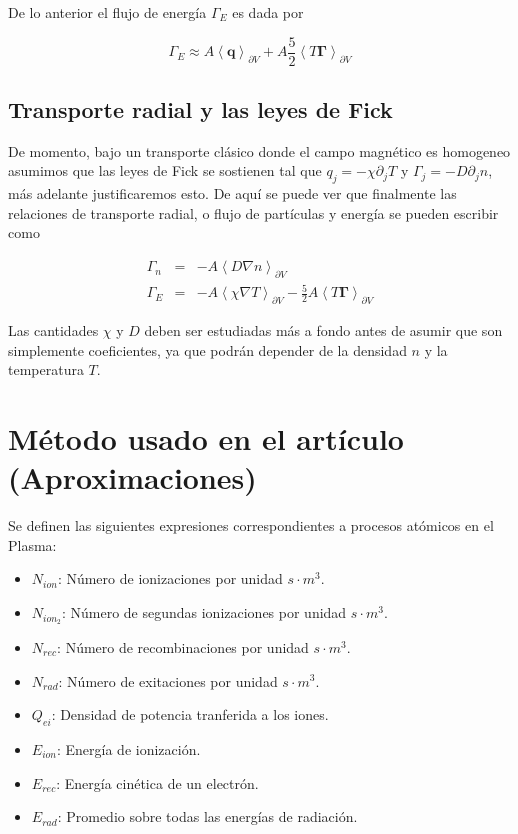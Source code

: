 \documentclass[11pt]{article}
\theoremstyle{definition}
\begin{document}
  De lo anterior el flujo de energ\'ia $\Gamma_E$ es dada por 

  \begin{equation}\label{eq:heatfluxp}
    \Gamma_E \approx A\left<\textbf{q}\right>_{\partial V} + A\frac{5}{2}\left<T\pmb{\Gamma}\right>_{\partial V}
  \end{equation}

  \subsection{Transporte radial y las leyes de Fick}

  De momento, bajo un transporte cl\'asico donde el campo magn\'etico es homogeneo asumimos que las leyes de Fick se sostienen tal que $q_j = -\chi\partial_j T$ y $\Gamma_j = -D\partial_j n$, m\'as adelante justificaremos esto. De aqu\'i se puede ver que finalmente las relaciones de transporte radial, o flujo de part\'iculas y energ\'ia se pueden escribir como

  \begin{eqnarray}
    \Gamma_n &=& -A\left<D\nabla n\right>_{\partial V}\\
    \Gamma_E &=& -A\left<\chi\nabla T\right>_{\partial V} - \frac{5}{2}A\left<T\pmb{\Gamma}\right>_{\partial V}
    \end{eqnarray}
    
  Las cantidades $\chi$ y $D$ deben ser estudiadas m\'as a fondo antes de asumir que son simplemente coeficientes, ya que podr\'an depender de la densidad $n$ y la temperatura $T$.

  \section{M\'etodo usado en el art\'iculo (Aproximaciones)}

  Se definen las siguientes expresiones correspondientes a procesos at\'omicos en el Plasma:

  \begin{itemize}
    \item $N_{ion}$: N\'umero de ionizaciones por unidad $s\cdot m^3$.
    \item $N_{ion_2}$: N\'umero de segundas ionizaciones por unidad $s\cdot m^3$.
    \item $N_{rec}$: N\'umero de recombinaciones por unidad $s\cdot m^3$.
    \item $N_{rad}$: N\'umero de exitaciones por unidad $s\cdot m^3$.
    \item $Q_{ei}$: Densidad de potencia tranferida a los iones.
    \item $E_{ion}$: Energ\'ia de ionizaci\'on.
    \item $E_{rec}$: Energ\'ia cin\'etica de un electr\'on.
    \item $E_{rad}$: Promedio sobre todas las energ\'ias de radiaci\'on.
  \end{itemize}
\end{document}

